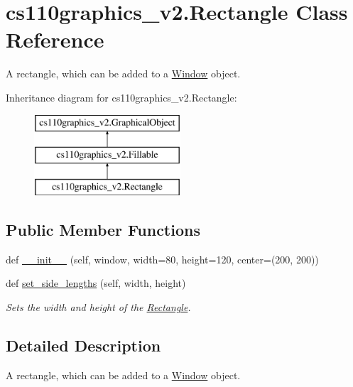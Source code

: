 \hypertarget{classcs110graphics__v2_1_1Rectangle}{}\section{cs110graphics\+\_\+v2.\+Rectangle Class Reference}
\label{classcs110graphics__v2_1_1Rectangle}


A rectangle, which can be added to a \mbox{\hyperlink{classcs110graphics__v2_1_1Window}{Window}} object.  


Inheritance diagram for cs110graphics\+\_\+v2.\+Rectangle\+:\begin{figure}[H]
\begin{center}
\leavevmode
\includegraphics[height=3.000000cm]{classcs110graphics__v2_1_1Rectangle}
\end{center}
\end{figure}
\subsection*{Public Member Functions}
\begin{DoxyCompactItemize}
\item 
def \mbox{\hyperlink{classcs110graphics__v2_1_1Rectangle_aac675f7d15aec8bc1557225eefcc8931}{\+\_\+\+\_\+init\+\_\+\+\_\+}} (self, window, width=80, height=120, center=(200, 200))
\item 
def \mbox{\hyperlink{classcs110graphics__v2_1_1Rectangle_aadd42b3f28b19e2bc61a1112ef81e2d9}{set\+\_\+side\+\_\+lengths}} (self, width, height)
\begin{DoxyCompactList}\small\item\em Sets the width and height of the \mbox{\hyperlink{classcs110graphics__v2_1_1Rectangle}{Rectangle}}. \end{DoxyCompactList}\end{DoxyCompactItemize}


\subsection{Detailed Description}
A rectangle, which can be added to a \mbox{\hyperlink{classcs110graphics__v2_1_1Window}{Window}} object. 



